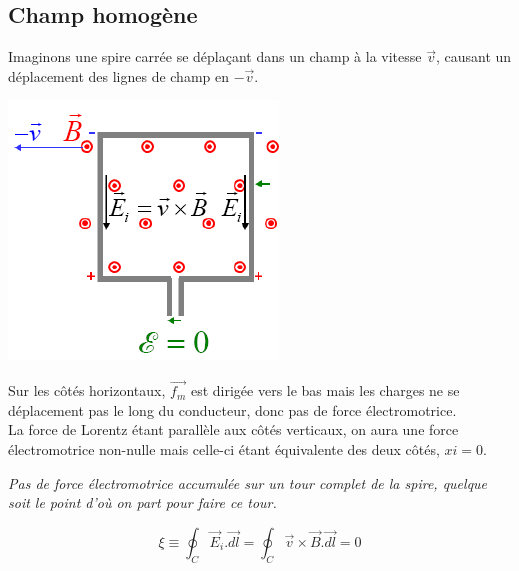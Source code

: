 \documentclass	[11pt, a4paper, openany]{book}
\begin{document}
\subsection{Champ homogène}
Imaginons une spire carrée se déplaçant dans un champ à la vitesse $\vec{v}$, causant un déplacement des lignes de champ en $-\vec{v}$. 
\begin{center}
\includegraphics[scale=0.45]{em/image8.png}\\
\end{center}
Sur les côtés horizontaux, $\vec{f_m}$ est dirigée vers le bas mais les charges ne se déplacement pas le long du conducteur, donc pas de force électromotrice.\\

La force de Lorentz étant parallèle aux côtés verticaux, on aura une force électromotrice non-nulle mais celle-ci étant équivalente des deux côtés, $xi = 0$.
\begin{center}
\textit{Pas de force électromotrice accumulée sur un tour complet de la spire, quelque soit le point d'où on part pour faire ce tour.}
\end{center}
\begin{equation}
\xi \equiv \oint_C \vec{E}_i.\vec{dl} = \oint_C \vec{v} \times \vec{B}.\vec{dl} = 0
\end{equation}
\end{document}
